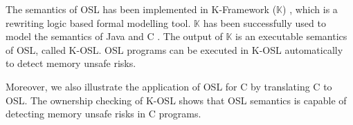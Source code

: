 \documentclass[runningheads]{llncs}
\begin{document}


The semantics of OSL has been implemented in K-Framework ($\mathbb{K}$) \cite{rosu-serbanuta-2010-jlap}, which is a rewriting logic based formal modelling tool. 
$\mathbb{K}$ has been successfully used to model the semantics of Java \cite{bogdanas-rosu-2015-popl} and C \cite{hathhorn-ellison-rosu-2015-pldi}.
The output of $\mathbb{K}$ is an executable semantics of OSL, called K-OSL. 
OSL programs can be executed in K-OSL automatically to detect memory unsafe risks.


Moreover, we also illustrate the application of OSL for C by translating C to OSL. 
The ownership checking of K-OSL shows that OSL semantics is capable of detecting memory unsafe risks in C programs.


\end{document}
